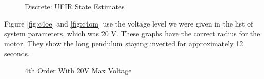 \documentclass{article}
\begin{document}
\begin{figure}
\centering
{}
\caption{Discrete: UFIR State Estimates}
\end{figure}

Figure \ref{fig:c4oe} and \ref{fig:c4om} use the voltage level we were given in the list of system parameters, which was 20 V. These graphs have the correct radius for the motor. They show the long pendulum staying inverted for approximately 12 seconds.

\begin{figure}
\centering
{}
\caption{4th Order With 20V Max Voltage}
\end{figure}
\end{document}
